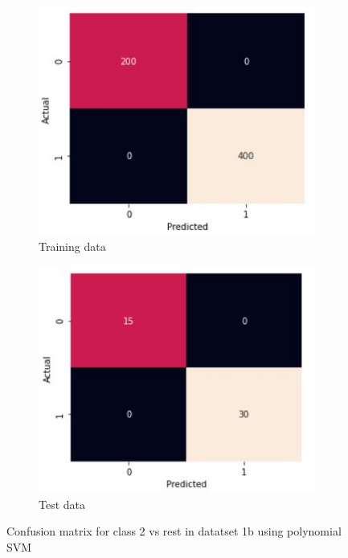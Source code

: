\documentclass[11pt]{article}
\begin{document}
\newpage
\begin{figure}[h]
\centering
	\begin{subfigure}[b]{0.45\textwidth}
	\centering
	\includegraphics[scale=0.5]{dataset1b_poly_svm_2_cm_train.jpg}
	\caption{Training data}
	\label{fig:fig2.2.3.1}
	\end{subfigure}
	\begin{subfigure}[b]{0.45\textwidth}
	\centering
	\includegraphics[scale=0.5]{dataset1b_poly_svm_2_cm_test.jpg}
	\caption{Test data}
	\label{fig:fig2.2.3.2}
	\end{subfigure}
\caption{Confusion matrix for class 2 vs rest in datatset 1b using polynomial SVM}
\label{fig:fig2.2.3}
\end{figure}
\end{document}

